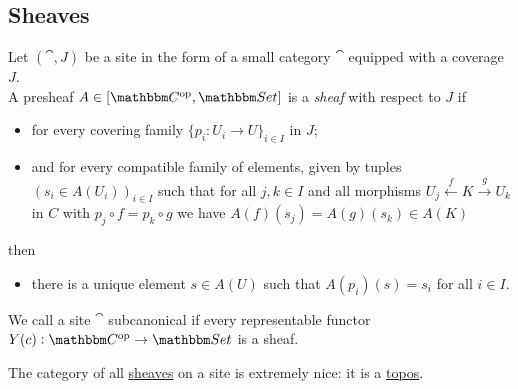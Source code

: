 \documentclass[a4paper,11pt]{article}  %
\begin{document}
\subsection{Sheaves}
%
\begin{definition}[Sheaf]
Let $(\cat,J)$ be a site in the form of a small category $\cat$ equipped with a coverage $J$.
\\
A presheaf $A \in [\cat^\op,\Set]$ is a \emph{sheaf} with respect to $J$ if
\begin{itemize}
	\item for every covering family $\{p_i : U_i \to U\}_{i \in I}$ in $J$;
	\item and for every compatible family of elements, given by tuples $(s_i \in A(U_i))_{i \in I}$ such that for all $j,k \in I$ and all morphisms $U_j \stackrel{f}{\leftarrow} K \stackrel{g}{\to} U_k$ in $C$ with $p_j \circ f = p_k \circ g$ we have $A(f)(s_j) = A(g)(s_k) \in A(K)$
\end{itemize}
then
\begin{itemize}
	\item there is a  unique  element $s \in A(U)$ such that $A(p_i)(s) = s_i$ for all $i \in I$.
\end{itemize}
\end{definition}

\begin{definition}
 We call a site $\cat$ subcanonical if every representable functor $Y(c): \cat^\op \to \Set$ is a sheaf.
\end{definition}

The category of all \href{https://ncatlab.org/nlab/show/sheaf#GeneralDefinitionAbstractly}{sheaves} on a site is extremely nice: it is a \href{https://ncatlab.org/nlab/show/topos#definitions}{topos}. 

\end{document}
